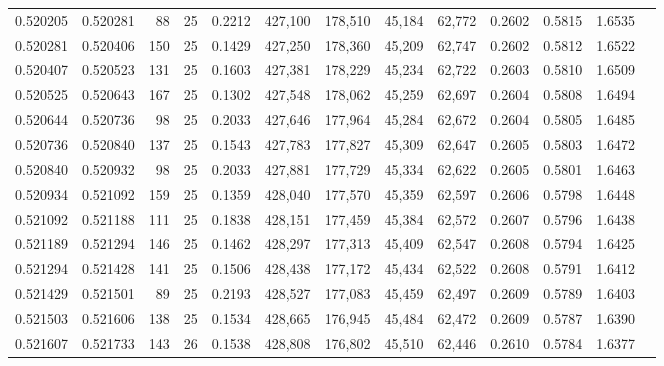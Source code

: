 \begin{tabular}{rrrrrrrrrrrrr}
0.520205 & 0.520281 &    88 &  25 &                                     0.2212 & 427,100 & 178,510 &  45,184 &  62,772 & 0.2602 & 0.5815 & 1.6535 \\
0.520281 & 0.520406 &   150 &  25 &                                     0.1429 & 427,250 & 178,360 &  45,209 &  62,747 & 0.2602 & 0.5812 & 1.6522 \\
0.520407 & 0.520523 &   131 &  25 &                                     0.1603 & 427,381 & 178,229 &  45,234 &  62,722 & 0.2603 & 0.5810 & 1.6509 \\
0.520525 & 0.520643 &   167 &  25 &                                     0.1302 & 427,548 & 178,062 &  45,259 &  62,697 & 0.2604 & 0.5808 & 1.6494 \\
0.520644 & 0.520736 &    98 &  25 &                                     0.2033 & 427,646 & 177,964 &  45,284 &  62,672 & 0.2604 & 0.5805 & 1.6485 \\
0.520736 & 0.520840 &   137 &  25 &                                     0.1543 & 427,783 & 177,827 &  45,309 &  62,647 & 0.2605 & 0.5803 & 1.6472 \\
0.520840 & 0.520932 &    98 &  25 &                                     0.2033 & 427,881 & 177,729 &  45,334 &  62,622 & 0.2605 & 0.5801 & 1.6463 \\
0.520934 & 0.521092 &   159 &  25 &                                     0.1359 & 428,040 & 177,570 &  45,359 &  62,597 & 0.2606 & 0.5798 & 1.6448 \\
0.521092 & 0.521188 &   111 &  25 &                                     0.1838 & 428,151 & 177,459 &  45,384 &  62,572 & 0.2607 & 0.5796 & 1.6438 \\
0.521189 & 0.521294 &   146 &  25 &                                     0.1462 & 428,297 & 177,313 &  45,409 &  62,547 & 0.2608 & 0.5794 & 1.6425 \\
0.521294 & 0.521428 &   141 &  25 &                                     0.1506 & 428,438 & 177,172 &  45,434 &  62,522 & 0.2608 & 0.5791 & 1.6412 \\
0.521429 & 0.521501 &    89 &  25 &                                     0.2193 & 428,527 & 177,083 &  45,459 &  62,497 & 0.2609 & 0.5789 & 1.6403 \\
0.521503 & 0.521606 &   138 &  25 &                                     0.1534 & 428,665 & 176,945 &  45,484 &  62,472 & 0.2609 & 0.5787 & 1.6390 \\
0.521607 & 0.521733 &   143 &  26 &                                     0.1538 & 428,808 & 176,802 &  45,510 &  62,446 & 0.2610 & 0.5784 & 1.6377 \\

\end{tabular}
